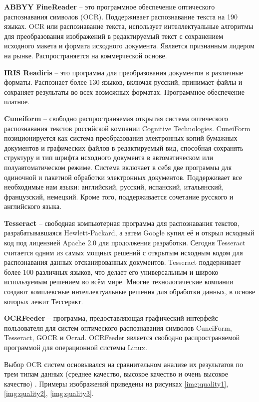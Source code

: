 \textbf{ABBYY FineReader} \cite{finereader} -- это программное обеспечение оптического распознавания символов (OCR). Поддерживает распознавание текста на 190 языках. OCR или распознавание текста, использует интеллектуальные алгоритмы для преобразования изображений в редактируемый текст с сохранением исходного макета и формата исходного документа. Является признанным лидером на рынке. Распространяется на коммерческой основе.

\textbf{IRIS Readiris} \cite{readiris} -- это программа для преобразования документов в различные форматы. Распознает более 130 языков, включая русский, принимает файлы и сохраняет результаты во всех возможных форматах. Программное обеспечение платное. 

\textbf{Cuneiform} \cite{cuneiform} -- свободно распространяемая открытая система оптического распознавания текстов российской компании Cognitive Technologies. CuneiForm позиционируется как система преобразования электронных копий бумажных документов и графических файлов в редактируемый вид, способная сохранять структуру и тип шрифта исходного документа в автоматическом или полуавтоматическом режиме. Система включает в себя две программы для одиночной и пакетной обработки электронных документов. Поддерживает все необходимые нам языки: английский, русский, испанский, итальянский, французский, немецкий. Кроме того, поддерживается сочетание русского и английского языка. 

\textbf{Tesseract} \cite{tesseract} -- свободная компьютерная программа для распознавания текстов, разрабатывавшаяся Hewlett-Packard, а затем Google купил её и открыл исходный код под лицензией Apache 2.0 для продолжения разработки. Сегодня Tesseract считается одним из самых мощных решений с открытым исходным кодом для распознавания данных отсканированных документов. Tesseract поддерживает более 100 различных языков, что делает его универсальным и широко используемым решением во всём мире. Многие технологические компании создают комплексные интеллектуальные решения для обработки данных, в основе которых лежит Тессеракт.

\textbf{OCRFeeder} \cite{ocrfeeder} -- программа, предоставляющая графический интерфейс пользователя для систем оптического распознавания символов CuneiForm, Tesseract, GOCR и Ocrad. OCRFeeder является свободно распространяемой программой для операционной системы Linux.

Выбор OCR систем основывался на сравнительном анализе их результатов по трем типам данных (среднее качество, высокое качество и очень высокое качество) \cite{textocr}. Примеры изображений приведены на рисунках \ref{img:quality1}, \ref{img:quality2}, \ref{img:quality3}.


